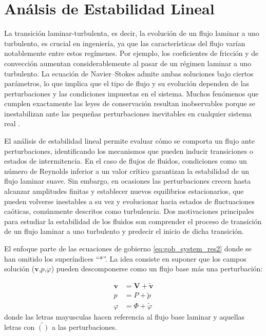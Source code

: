 \section{Análsis de Estabilidad Lineal}

La transición laminar-turbulenta, es decir, la evolución de un flujo laminar a uno turbulento, es crucial en ingeniería, ya que las características del flujo varían notablemente entre estos regímenes. Por ejemplo, los coeficientes de fricción y de convección aumentan considerablemente al pasar de un régimen laminar a uno turbulento. La ecuación de Navier–Stokes admite ambas soluciones bajo ciertos parámetros, lo que implica que el tipo de flujo y su evolución dependen de las perturbaciones y las condiciones impuestas en el sistema. Muchos fenómenos que cumplen exactamente las leyes de conservación resultan inobservables porque se inestabilizan ante las pequeñas perturbaciones inevitables en cualquier sistema real \cite{kundu}.

El análisis de estabilidad lineal permite evaluar cómo se comporta un flujo ante perturbaciones, identificando los mecanismos que pueden inducir transiciones o estados de intermitencia. En el caso de flujos de fluidos, condiciones como un número de Reynolds inferior a un valor crítico garantizan la estabilidad de un flujo laminar suave. Sin embargo, en ocasiones las perturbaciones crecen hasta alcanzar amplitudes finitas y establecer nuevos equilibrios estacionarios, que pueden volverse inestables a su vez y evolucionar hacia estados de fluctuaciones caóticas, comúnmente descritos como turbulencia. Dos motivaciones principales para estudiar la estabilidad de los fluidos son comprender el proceso de transición de un flujo laminar a uno turbulento y predecir el inicio de dicha transición.

El enfoque parte de las ecuaciones de gobierno \ref{eq:gob_system_res2} donde se han omitido los superíndices ``*''. La idea consiste en suponer que los campos solución ($\mathbf{v}$,$p$,$\varphi$) pueden descomponerse como un flujo base más una perturbación:

\begin{align}
\mathbf{v} &= \mathbf{V} + \widetilde{\mathbf{v}} \\
p &= P + \widetilde{p} \\
\varphi &= \Phi + \widetilde{\varphi}
\end{align}  
donde las letras mayusculas hacen referencia al flujo base laminar y aquellas letras con $\widetilde{()}$ a las perturbaciones. %

